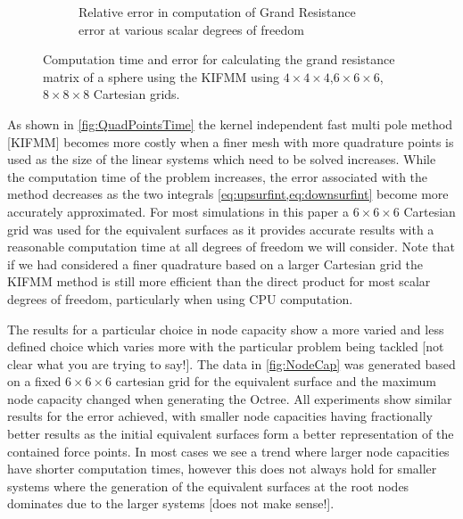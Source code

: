 \begin{figure}[ht]
\begin{subfigure}[b]{0.49\textwidth}
         \caption{Relative error in computation of Grand Resistance error at various scalar degrees of freedom}
         \label{fig:QuadPointsError}
     \end{subfigure}
        \caption{Computation time and error for calculating the grand resistance matrix of a sphere using the KIFMM using $4\times4\times4$,$6\times6\times6$,$8\times8\times8$ Cartesian grids.}
        \label{fig:QuadPoints}
\end{figure}

As shown in \cref{fig:QuadPointsTime} the kernel independent fast multi pole method [KIFMM] becomes more costly when a finer mesh with more quadrature points is used as the size of the linear systems which need to be solved increases. While the computation time of the problem increases, the error associated with the method decreases as the two integrals \cref{eq:upsurfint,eq:downsurfint} become more accurately approximated. For most simulations in this paper a $6\times6\times6$ Cartesian grid was used for the equivalent surfaces as it provides accurate results with a reasonable computation time at all degrees of freedom we will consider. Note that if we had considered a finer quadrature based on a larger Cartesian grid the KIFMM method is still more efficient than the direct product for most scalar degrees of freedom, particularly when using CPU computation. 

The results for a particular choice in node capacity show a more varied and less defined choice which varies more with the particular problem being tackled [not clear what you are trying to say!]. The data in \cref{fig:NodeCap} was generated based on a fixed $6\times6\times6$ cartesian grid for the equivalent surface and the maximum node capacity changed when generating the Octree. All experiments show similar results for the error achieved, with smaller node capacities having fractionally better results as the initial equivalent surfaces form a better representation of the contained force points. In most cases we see a trend where larger node capacities have shorter computation times, however this does not always hold for smaller systems where the generation of the equivalent surfaces at the root nodes dominates due to the larger systems [does not make sense!]. 

